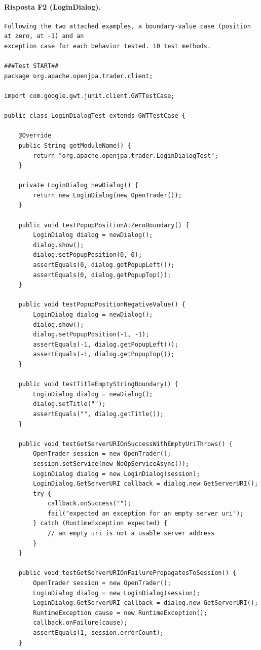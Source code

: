 \paragraph*{Risposta F2 (LoginDialog).}
\label{risposta:ld-f2}
\begin{lstlisting}
Following the two attached examples, a boundary-value case (position at zero, at -1) and an
exception case for each behavior tested. 10 test methods.

###Test START##
package org.apache.openjpa.trader.client;

import com.google.gwt.junit.client.GWTTestCase;

public class LoginDialogTest extends GWTTestCase {

    @Override
    public String getModuleName() {
        return "org.apache.openjpa.trader.LoginDialogTest";
    }

    private LoginDialog newDialog() {
        return new LoginDialog(new OpenTrader());
    }

    public void testPopupPositionAtZeroBoundary() {
        LoginDialog dialog = newDialog();
        dialog.show();
        dialog.setPopupPosition(0, 0);
        assertEquals(0, dialog.getPopupLeft());
        assertEquals(0, dialog.getPopupTop());
    }

    public void testPopupPositionNegativeValue() {
        LoginDialog dialog = newDialog();
        dialog.show();
        dialog.setPopupPosition(-1, -1);
        assertEquals(-1, dialog.getPopupLeft());
        assertEquals(-1, dialog.getPopupTop());
    }

    public void testTitleEmptyStringBoundary() {
        LoginDialog dialog = newDialog();
        dialog.setTitle("");
        assertEquals("", dialog.getTitle());
    }

    public void testGetServerURIOnSuccessWithEmptyUriThrows() {
        OpenTrader session = new OpenTrader();
        session.setService(new NoOpServiceAsync());
        LoginDialog dialog = new LoginDialog(session);
        LoginDialog.GetServerURI callback = dialog.new GetServerURI();
        try {
            callback.onSuccess("");
            fail("expected an exception for an empty server uri");
        } catch (RuntimeException expected) {
            // an empty uri is not a usable server address
        }
    }

    public void testGetServerURIOnFailurePropagatesToSession() {
        OpenTrader session = new OpenTrader();
        LoginDialog dialog = new LoginDialog(session);
        LoginDialog.GetServerURI callback = dialog.new GetServerURI();
        RuntimeException cause = new RuntimeException();
        callback.onFailure(cause);
        assertEquals(1, session.errorCount);
    }


\end{lstlisting}
